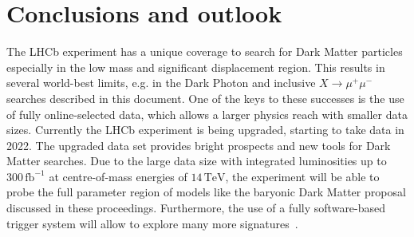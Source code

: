 \documentclass[a4paper,11pt]{article}
\begin{document}
\section{Conclusions and outlook}
The LHCb experiment has a unique coverage to search for Dark Matter particles especially in the low mass and significant displacement region. This results in several world-best limits, e.g. in the Dark Photon and inclusive $X\to\mu^+\mu^-$ searches described in this document. One of the keys to these successes is the use of fully online-selected data, which allows a larger physics reach with smaller data sizes. Currently the LHCb experiment is being upgraded, starting to take data in 2022.
The upgraded data set provides bright prospects and new tools for Dark Matter searches.
Due to the large data size with integrated luminosities up to $300\,\text{fb}^{-1}$ at centre-of-mass energies of $14\,\text{TeV}$, the experiment will be able to probe the full parameter region of models like the baryonic Dark Matter proposal discussed in these proceedings. Furthermore, the use of a fully software-based trigger system will allow to explore many more signatures~\cite{Stealth}.
\end{document}
